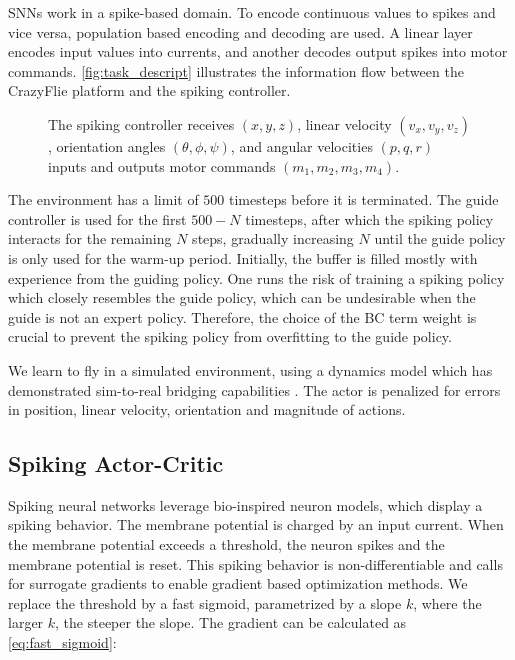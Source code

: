 SNNs work in a spike-based domain. To encode continuous values to spikes and vice versa, population based encoding and decoding are used. A linear layer encodes input values into currents, and another decodes output spikes into motor commands. \autoref{fig:task_descript} illustrates the information flow between the CrazyFlie platform and the spiking controller.

\begin{figure}[ht!]
    \centering
        \centering
        
        \caption{The spiking controller receives $(x, y, z)$, linear velocity $(v_x, v_y, v_z)$, orientation angles $(\theta, \phi, \psi)$, and angular velocities $(p, q, r)$ inputs and outputs motor commands $(m_1, m_2, m_3, m_4)$. }
        \label{fig:task_descript}
\end{figure}

The environment has a limit of $500$ timesteps before it is terminated. The guide controller is used for the first $500-N$ timesteps, after which the spiking policy interacts for the remaining $N$ steps, gradually increasing $N$ until the guide policy is only used for the warm-up period. Initially, the buffer is filled mostly with experience from the guiding policy. One runs the risk of training a spiking policy which closely resembles the guide policy, which can be undesirable when the guide is not an expert policy. Therefore, the choice of the BC term weight is crucial to prevent the spiking policy from overfitting to the guide policy.

We learn to fly in a simulated environment, using a dynamics model which has demonstrated sim-to-real bridging capabilities \cite{Eschmann2023}. The actor is penalized for errors in position, linear velocity, orientation and magnitude of actions. 


\subsection{Spiking Actor-Critic}\label{subsection:S-AC}
Spiking neural networks leverage bio-inspired neuron models, which display a spiking behavior. The membrane potential is charged by an input current. When the membrane potential exceeds a threshold, the neuron spikes and the membrane potential is reset. This spiking behavior is non-differentiable and calls for surrogate gradients \cite{NeftciSurrogate} to enable gradient based optimization methods. We replace the threshold by a fast sigmoid, parametrized by a slope $k$, where the larger $k$, the steeper the slope. The gradient can be calculated as \autoref{eq:fast_sigmoid}:

